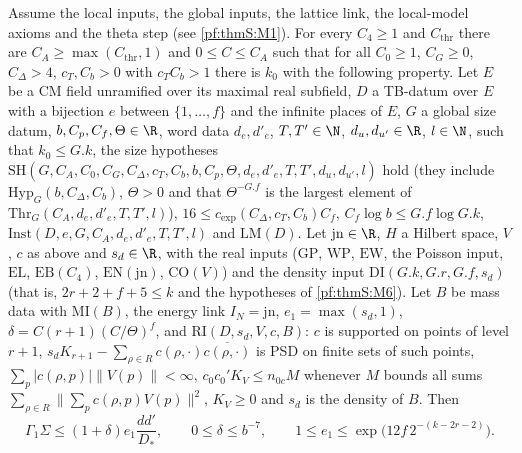 \begin{theorem}\label{pf:thmS:mainrowthm}
Assume the local inputs, the global inputs, the lattice link, the local-model axioms and the theta step (see \ref{pf:thmS:M1}). For every $C_4\ge1$ and $C_{\mathrm{thr}}$ there are $C_A\ge\max(C_{\mathrm{thr}},1)$ and $0\le
C\le C_A$ such that for all $C_0\ge1$, $C_G\ge0$, $C_\Delta>4$, $c_T,C_b>0$ with $c_TC_b>1$ there is $k_0$ with the
following property. Let $E$ be a CM field unramified over its maximal real subfield, $D$ a TB-datum over $E$ with a
bijection $e$ between $\{1,\dots,f\}$ and the infinite places of $E$, $G$ a global size datum, $b,C_p,C_f,\Theta\in\R$, word
data $d_e,d'_e$, $T,T'\in\N$, $d_u,d_{u'}\in\R$, $l\in\N$, such that $k_0\le G.k$, the size hypotheses
$\mathrm{SH}(G,C_A,C_0,C_G,C_\Delta,c_T,C_b,b,C_p,\Theta,d_e,d'_e,T,T',d_u,d_{u'},l)$ hold (they include
$\mathrm{Hyp}_G(b,C_\Delta,C_b)$, $\Theta>0$ and that $\Theta^{-G.f}$ is the largest element of
$\mathrm{Thr}_G(C_A,d_e,d'_e,T,T',l)$), $16\le c_{\exp}(C_\Delta,c_T,C_b)C_f$, $C_f\log b\le G.f\log G.k$,
$\mathrm{Inst}(D,e,G,C_A,d_e,d'_e,T,T',l)$ and $\mathrm{LM}(D)$. Let $\mathrm{jn}\in\R$, $H$ a Hilbert space,
$V$, $c$ as above and $s_d\in\R$, with the real inputs ($\mathrm{GP}$, $\mathrm{WP}$, $\mathrm{EW}$, the
Poisson input, $\mathrm{EL}$, $\mathrm{EB}(C_4)$, $\mathrm{EN}(\mathrm{jn})$, $\mathrm{CO}(V)$) and the
density input $\mathrm{DI}(G.k,G.r,G.f,s_d)$ (that is, $2r+2+f+5\le k$ and the hypotheses of \ref{pf:thmS:M6}).
Let $B$ be mass data with $\mathrm{MI}(B)$, the energy link $I_N=\mathrm{jn}$, $e_1=\max(s_d,1)$,
$\delta=C(r+1)(C/\Theta)^f$, and $\mathrm{RI}(D,s_d,V,c,B)$: $c$ is supported on points of level $r+1$,
$s_dK_{r+1}-\sum_{\rho\in R}c(\rho,\cdot)\overline{c(\rho,\cdot)}$ is PSD on finite sets of such points, $\sum_p|c(\rho,p)|
\|V(p)\|<\infty$, $c_0c_0'K_V\le n_{0c}M$ whenever $M$ bounds all sums $\sum_{\rho\in R}\|\sum_pc(\rho,p)V(p)\|^2$,
$K_V\ge0$ and $s_d$ is the density of $B$. Then
\[
\Gamma_1\Sigma\le(1+\delta)e_1\frac{dd'}{D_*},\qquad0\le\delta\le b^{-7},\qquad1\le e_1\le\exp\bigl(12f\,2^{-(k-2r-2)}\bigr).
\]
\end{theorem}

